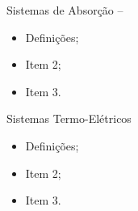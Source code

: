     \begin{frame}\vspace*{-0em}
    \end{frame}

    \begin{frame}\vspace*{-0em}
    \end{frame}

    \begin{frame}[allowframebreaks]{Sistemas de Absorção -- }\vspace*{-0em}
        \begin{itemize}
            \item<1-> Definições;
            \item<1-> Item 2;
            \item<1-> Item 3.
        \end{itemize}
    \end{frame}

    \begin{frame}{Sistemas Termo-Elétricos}\vspace*{-0em}
        \begin{itemize}
            \item<1-> Definições;
            \item<1-> Item 2;
            \item<1-> Item 3.
        \end{itemize}
    \end{frame}

